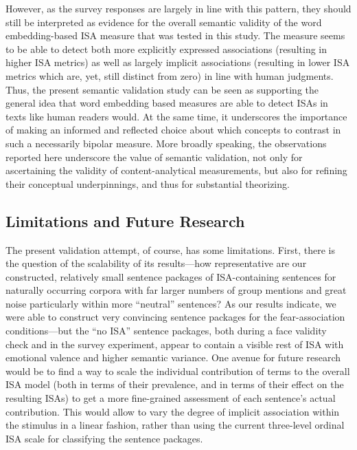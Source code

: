 However, as the survey responses are largely in line with this pattern, they should still be interpreted as evidence for the overall semantic validity of the word embedding-based ISA measure that was tested in this study. The measure seems to be able to detect both more explicitly expressed associations (resulting in higher ISA metrics) as well as largely implicit associations (resulting in lower ISA metrics which are, yet, still distinct from zero) in line with human judgments. Thus, the present semantic validation study can be seen as supporting the general idea that word embedding based measures are able to detect ISAs in texts like human readers would. At the same time, it underscores the importance of making an informed and reflected choice about which concepts to contrast in such a necessarily bipolar measure. More broadly speaking, the observations reported here underscore the value of semantic validation, not only for ascertaining the validity of content-analytical measurements, but also for refining their conceptual underpinnings, and thus for substantial theorizing.

\subsection{Limitations and Future Research}

The present validation attempt, of course, has some limitations. First, there is the question of the scalability of its results---how representative are our constructed, relatively small sentence packages of ISA-containing sentences for naturally occurring corpora with far larger numbers of group mentions and great noise particularly within more ``neutral'' sentences? As our results indicate, we were able to construct very convincing sentence packages for the fear-association conditions---but the ``no ISA'' sentence packages, both during a face validity check and in the survey experiment, appear to contain a visible rest of ISA with emotional valence and higher semantic variance. One avenue for future research would be to find a way to scale the individual contribution of terms to the overall ISA model (both in terms of their prevalence, and in terms of their effect on the resulting ISAs) to get a more fine-grained assessment of each sentence’s actual contribution. This would allow to vary the degree of implicit association within the stimulus in a linear fashion, rather than using the current three-level ordinal ISA scale for classifying the sentence packages. 

